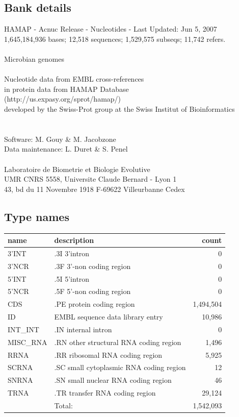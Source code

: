 \documentclass{article}
\begin{document}
\begin{Schunk}
\subsection{Bank details}
HAMAP - Acnuc Release - Nucleotides - Last Updated: Jun  5, 2007\\
1,645,184,936 bases; 12,518 sequences; 1,529,575 subseqs; 11,742 refers.\\
\\
Microbian genomes\\
\\
Nucleotide data from  EMBL cross-references\\
in protein data from  HAMAP Database\\
(http://us.expasy.org/sprot/hamap/)\\
developed by the Swiss-Prot group at the Swiss Institut of Bioinformatics\\
\\
\\
Software: M. Gouy \& M. Jacobzone\\
Data maintenance: L. Duret \& S. Penel\\
\\
Laboratoire de Biometrie et Biologie Evolutive\\
UMR CNRS 5558, Universite Claude Bernard - Lyon 1\\
43, bd du 11 Novembre 1918 F-69622 Villeurbanne Cedex\\


\subsection{Type names}
\noindent\begin{tabular}{llr}
\hline \hline
name & description & count \\
\hline
3'INT  &  .3I 3'intron  &  0 \\
3'NCR  &  .3F  3'-non coding region  &  0 \\
5'INT  &  .5I 5'intron  &  0 \\
5'NCR  &  .5F  5'-non coding region  &  0 \\
CDS  &  .PE protein coding region  &  1,494,504 \\
ID  &  EMBL sequence data library entry  &  10,986 \\
INT\_INT  &  .IN  internal intron  &  0 \\
MISC\_RNA  &  .RN other structural RNA coding region  &  1,496 \\
RRNA  &  .RR ribosomal RNA coding region  &  5,925 \\
SCRNA  &  .SC small cytoplasmic RNA coding region  &  12 \\
SNRNA  &  .SN small nuclear RNA coding region  &  46 \\
TRNA  &  .TR transfer RNA coding region  &  29,124 \\
\hline
 & Total: & 1,542,093 \\
\hline \hline
\end{tabular}


\end{Schunk}
\end{document}
